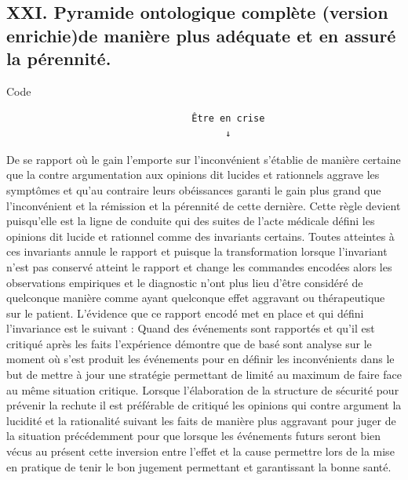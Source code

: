 \documentclass[12pt,a4paper]{article}
\begin{document}
\subsection*{XXI. Pyramide ontologique complète (version enrichie)de manière plus adéquate et en assuré la pérennité.}
Code
\begin{verbatim}
                                 Être en crise
                                       ↓
\end{verbatim}
De se rapport où le gain l’emporte sur l’inconvénient s’établie de manière certaine que la contre argumentation aux opinions dit lucides et rationnels aggrave les symptômes et qu’au contraire leurs obéissances garanti le gain plus grand que l’inconvénient et la rémission et la pérennité de cette dernière. Cette règle devient puisqu’elle est la ligne de conduite qui des suites de l’acte médicale défini les opinions dit lucide et rationnel comme des invariants certains. Toutes atteintes à ces invariants annule le rapport et puisque la transformation lorsque l’invariant n’est pas conservé atteint le rapport et change les commandes encodées alors les observations empiriques et le diagnostic n’ont plus lieu d’être considéré de quelconque manière comme ayant quelconque effet aggravant ou thérapeutique sur le patient.
L’évidence que ce rapport encodé met en place et qui défini l’invariance est le suivant : Quand des événements sont rapportés et qu’il est critiqué après les faits l’expérience démontre que de basé sont analyse sur le moment où s’est produit les événements pour en définir les inconvénients dans le but de mettre à jour une stratégie permettant de limité au maximum de faire face au même situation critique. Lorsque l’élaboration de la structure de sécurité pour prévenir la rechute il est préférable de critiqué les opinions qui contre argument la lucidité et la rationalité suivant les faits de manière plus aggravant pour juger de la situation précédemment pour que lorsque les événements futurs seront bien vécus au présent cette inversion entre l’effet et la cause permettre lors de la mise en pratique de tenir le bon jugement permettant et garantissant la bonne santé.
\end{document}
